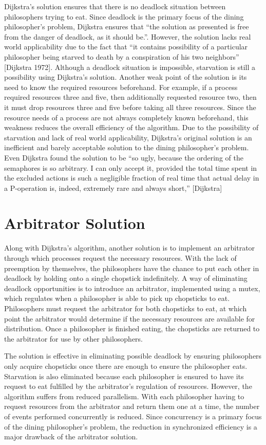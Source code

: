 \documentclass{article}
\begin{document}
Dijkstra's solution ensures that there is no deadlock situation between philosophers trying to eat. Since deadlock is the primary focus of the dining philosopher's problem, Dijkstra ensures that ``the solution as presented is free from the danger of deadlock, as it should be.''. However, the solution lacks real world applicability due to the fact that ``it contains possibility of a particular philosopher being starved to death by a conspiration of his two neighbors'' [Dijkstra 1972]. Although a deadlock situation is impossible, starvation is still a possibility using Dijkstra's solution. Another weak point of the solution is its need to know the required resources beforehand. For example, if a process required resources three and five, then additionally requested resource two, then it must drop resources three and five before taking all three resources. Since the resource needs of a process are not always completely known beforehand, this weakness reduces the overall efficiency of the algorithm. Due to the possibility of starvation and lack of real world applicability, Dijkstra's original solution is an inefficient and barely acceptable solution to the dining philosopher's problem. Even Dijkstra found the solution to be ``so ugly, because the ordering of the semaphores is so arbitrary. I can only accept it, provided the total time spent in the excluded actions is such a negligible fraction of real time that actual delay in a P-operation is, indeed, extremely rare and always short,'' [Dijkstra]

\section{Arbitrator Solution} Along with Dijkstra's algorithm, another solution is to implement an arbitrator through which processes request the necessary resources. With the lack of preemption by themselves, the philosophers have the chance to put each other in deadlock by holding onto a single chopstick indefinitely. A way of eliminating deadlock opportunities is to introduce an arbitrator, implemented using a mutex, which regulates when a philosopher is able to pick up chopsticks to eat. Philosophers must request the arbitrator for both chopsticks to eat, at which point the arbitrator would determine if the necessary resources are available for distribution. Once a philosopher is finished eating, the chopsticks are returned to the arbitrator for use by other philosophers.

The solution is effective in eliminating possible deadlock by ensuring philosophers only acquire chopsticks once there are enough to ensure the philosopher eats. Starvation is also eliminated because each philosopher is ensured to have its request to eat fulfilled by the arbitrator's regulation of resources. However, the algorithm suffers from reduced parallelism. With each philosopher having to request resources from the arbitrator and return them one at a time, the number of events performed concurrently is reduced. Since concurrency is a primary focus of the dining philosopher's problem, the reduction in synchronized efficiency is a major drawback of the arbitrator solution.
\end{document}
